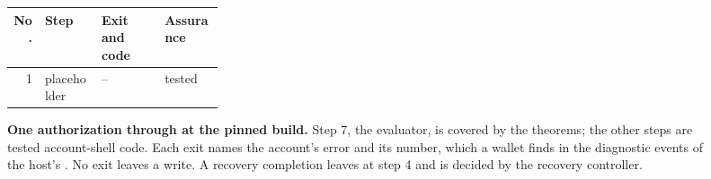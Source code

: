 \begin{figure}[tbp]
\centering
\footnotesize\begin{tabularx}{\linewidth}{@{}r>{\raggedright\arraybackslash}X>{\raggedright\arraybackslash}p{0.3\linewidth}l@{}}
\toprule
\textbf{No.} & \textbf{Step} & \textbf{Exit and code} & \textbf{Assurance} \\
\midrule
1 & placeholder & -- & tested \\
\bottomrule
\end{tabularx}
\caption{\textbf{One authorization through  at the pinned build.} Step 7, the evaluator, is covered by the theorems; the other steps are tested account-shell code. Each exit names the account's error and its number, which a wallet finds in the diagnostic events of the host's . No exit leaves a write. A recovery completion leaves at step 4 and is decided by the recovery controller.}\label{fig:fig-check-auth}
\end{figure}
